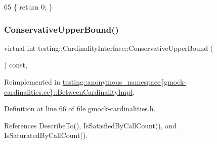 \begin{DoxyCode}
65 \{ \textcolor{keywordflow}{return} 0; \}
\end{DoxyCode}
\mbox{\label{classtesting_1_1CardinalityInterface_ac741b28605377d603623dddf4b1c8d33}} 
\subsubsection{\texorpdfstring{Conservative\+Upper\+Bound()}{ConservativeUpperBound()}}
{\footnotesize\ttfamily virtual int testing\+::\+Cardinality\+Interface\+::\+Conservative\+Upper\+Bound (\begin{DoxyParamCaption}{ }\end{DoxyParamCaption}) const\hspace{0.3cm}{\ttfamily [inline]}, {\ttfamily [virtual]}}



Reimplemented in \hyperlink{classtesting_1_1anonymous__namespace_02gmock-cardinalities_8cc_03_1_1BetweenCardinalityImpl_a56bf485881a7ccb217f98f0f83b23577}{testing\+::anonymous\+\_\+namespace\{gmock-\/cardinalities.\+cc\}\+::\+Between\+Cardinality\+Impl}.



Definition at line 66 of file gmock-\/cardinalities.\+h.



References Describe\+To(), Is\+Satisfied\+By\+Call\+Count(), and Is\+Saturated\+By\+Call\+Count().


